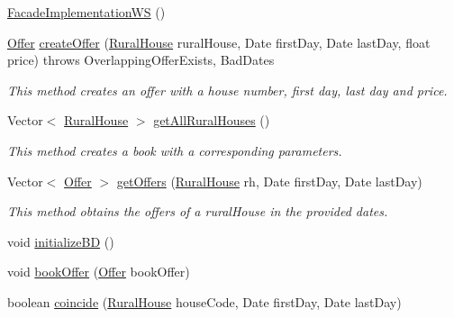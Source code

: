 \begin{DoxyCompactItemize}
\item 
\mbox{\hyperlink{classbusinessLogic_1_1FacadeImplementationWS_a22415eec1f4d0a160f02cfdc1ac80825}{Facade\+Implementation\+WS}} ()
\item 
\mbox{\hyperlink{classdomain_1_1Offer}{Offer}} \mbox{\hyperlink{classbusinessLogic_1_1FacadeImplementationWS_ac7b3bdfd0815ea7c787da312de594cce}{create\+Offer}} (\mbox{\hyperlink{classdomain_1_1RuralHouse}{Rural\+House}} rural\+House, Date first\+Day, Date last\+Day, float price)  throws Overlapping\+Offer\+Exists, Bad\+Dates  	
\begin{DoxyCompactList}\small\item\em This method creates an offer with a house number, first day, last day and price. \end{DoxyCompactList}\item 
Vector$<$ \mbox{\hyperlink{classdomain_1_1RuralHouse}{Rural\+House}} $>$ \mbox{\hyperlink{classbusinessLogic_1_1FacadeImplementationWS_aa6f21ddb40ca6cd752a13e31ff016e7e}{get\+All\+Rural\+Houses}} ()
\begin{DoxyCompactList}\small\item\em This method creates a book with a corresponding parameters. \end{DoxyCompactList}\item 
Vector$<$ \mbox{\hyperlink{classdomain_1_1Offer}{Offer}} $>$ \mbox{\hyperlink{classbusinessLogic_1_1FacadeImplementationWS_a7489fb15fdb8206b16daf6ed24fdfea0}{get\+Offers}} (\mbox{\hyperlink{classdomain_1_1RuralHouse}{Rural\+House}} rh, Date first\+Day, Date last\+Day)
\begin{DoxyCompactList}\small\item\em This method obtains the offers of a rural\+House in the provided dates. \end{DoxyCompactList}\item 
void \mbox{\hyperlink{classbusinessLogic_1_1FacadeImplementationWS_a94a4600e9c80794676f06c888e9e682d}{initialize\+BD}} ()
\item 
void \mbox{\hyperlink{classbusinessLogic_1_1FacadeImplementationWS_a0c3a269d277719643ca61e030580812a}{book\+Offer}} (\mbox{\hyperlink{classdomain_1_1Offer}{Offer}} book\+Offer)
\item 
boolean \mbox{\hyperlink{classbusinessLogic_1_1FacadeImplementationWS_a6e8399739161cbb6a2830ebb9279de90}{coincide}} (\mbox{\hyperlink{classdomain_1_1RuralHouse}{Rural\+House}} house\+Code, Date first\+Day, Date last\+Day)
\end{DoxyCompactItemize}


